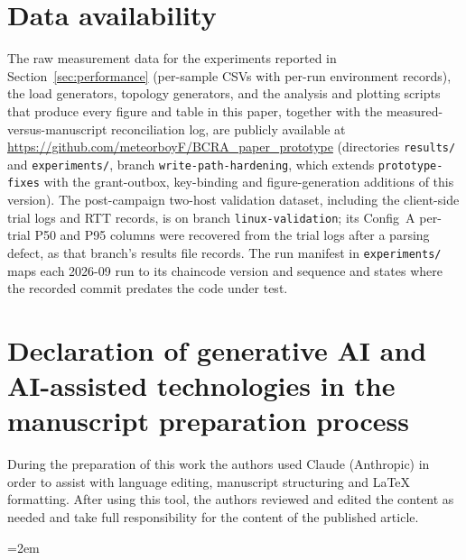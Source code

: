 \documentclass[preprint,12pt]{elsarticle}
\begin{document}
\section*{Data availability}
The raw measurement data for the experiments reported in
Section~\ref{sec:performance} (per-sample CSVs with per-run environment
records), the load generators, topology generators, and the analysis and
plotting scripts that produce every figure and table in this paper, together
with the measured-versus-manuscript reconciliation log, are publicly
available at
\url{https://github.com/meteorboyF/BCRA_paper_prototype}
(directories \texttt{results/} and \texttt{experiments/}, branch
\texttt{write-path-hardening}, which extends \texttt{prototype-fixes} with
the grant-outbox, key-binding and figure-generation additions of this
version). The post-campaign two-host validation dataset, including the
client-side trial logs and RTT records, is on branch
\texttt{linux-validation}; its Config~A per-trial P50 and P95 columns were
recovered from the trial logs after a parsing defect, as that branch's
results file records. The run manifest in \texttt{experiments/} maps each
2026-09 run to its chaincode version and sequence and states where the
recorded commit predates the code under test.

\section*{Declaration of generative AI and AI-assisted technologies in the
manuscript preparation process}
During the preparation of this work the authors used Claude (Anthropic) in
order to assist with language editing, manuscript structuring and \LaTeX{}
formatting. After using this tool, the authors reviewed and edited the
content as needed and take full responsibility for the content of the
published article.

\begingroup
\emergencystretch=2em


\endgroup
\end{document}
